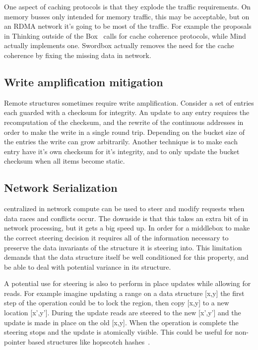 One aspect of caching protocols is that they explode the traffic requirements.
On memory busses only intended for memory traffic, this may be acceptable, but
on an RDMA network it's going to be most of the traffic. For example the
proposals in Thinking outside of the Box~\cite{design-far-memory-struct} calls
for cache coherence protocols, while Mind~\cite{mind} actually implements one.
Swordbox actually removes the need for the cache coherence by fixing the missing
data in network.

\subsection{Write amplification mitigation}
\label{sec:write-amplification}
Remote structures sometimes require write
amplification. Consider a set of entries each guarded with a checksum for
integrity. An update to any entry requires the recomputation of the checksum,
and the rewrite of the continuous addresses in order to make the write in a
single round trip. Depending on the bucket size of the entries the write can
grow arbitrarily. Another technique is to make each entry have it's own checksum
for it's integrity, and to only update the bucket checksum when all items become
static.

\subsection{Network Serialization} 
\label{sec:net_ser}
%
centralized in network compute can be used to steer and modify
requests when data races and conflicts occur. The downside is that this takes an
extra bit of in network processing, but it gets a big speed up. In order for a
middlebox to make the correct steering decision it requires all of the
information necessary to preserve the data invariants of the structure it is
steering into. This limitation demands that the data structure itself be well
conditioned for this property, and be able to deal with potential variance in
its structure.

A potential use for steering is also to perform in place updates while allowing
for reads. For example imagine updating a range on a data structure [x,y] the
first step of the operation could be to lock the region, then copy [x,y] to a
new location [x',y']. During the update reads are steered to the new [x',y'] and
the update is made in place on the old [x,y]. When the operation is complete the
steering stops and the update is atomically visible. This could be useful for
non-pointer based structures like hopscotch hashes~\cite{hopscotch}.

